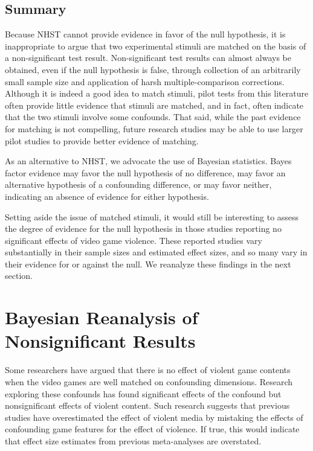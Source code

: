\documentclass[man]{apa6}
\begin{document}
\subsection{Summary}
Because NHST cannot provide evidence in favor of the null hypothesis, it is inappropriate to argue that two experimental stimuli are matched on the basis of a non-significant test result.  Non-significant test results can almost always be obtained, even if the null hypothesis is false, through collection of an arbitrarily small sample size and application of harsh multiple-comparison corrections.  Although it is indeed a good idea to match stimuli, pilot tests from this literature often provide little evidence that stimuli are matched, and in fact, often indicate that the two stimuli involve some confounds. That said, while the past evidence for matching is not compelling, future research studies may be able to use larger pilot studies to provide better evidence of matching. 
 
As an alternative to NHST, we advocate the use of Bayesian statistics. Bayes factor evidence may favor the null hypothesis of no difference, may favor an alternative hypothesis of a confounding difference, or may favor neither, indicating an absence of evidence for either hypothesis. 

Setting aside the issue of matched stimuli, it would still be interesting to assess the degree of evidence for the null hypothesis in those studies reporting no significant effects of video game violence. These reported studies vary substantially in their sample sizes and estimated effect sizes, and so many vary in their evidence for or against the null. We reanalyze these findings in the next section.

\section{Bayesian Reanalysis of Nonsignificant Results}
Some researchers have argued that there is no effect of violent game contents when the video games are well matched on confounding dimensions. Research exploring these confounds has found significant effects of the confound but nonsignificant effects of violent content. Such research suggests that previous studies have overestimated the effect of violent media by mistaking the effects of confounding game features for the effect of violence. If true, this would indicate that effect size estimates from previous meta-analyses \citep[e.g., $r = .21$ or $d = 0.43$,][]{Anderson:etal:2010} are overstated.  
\end{document}
